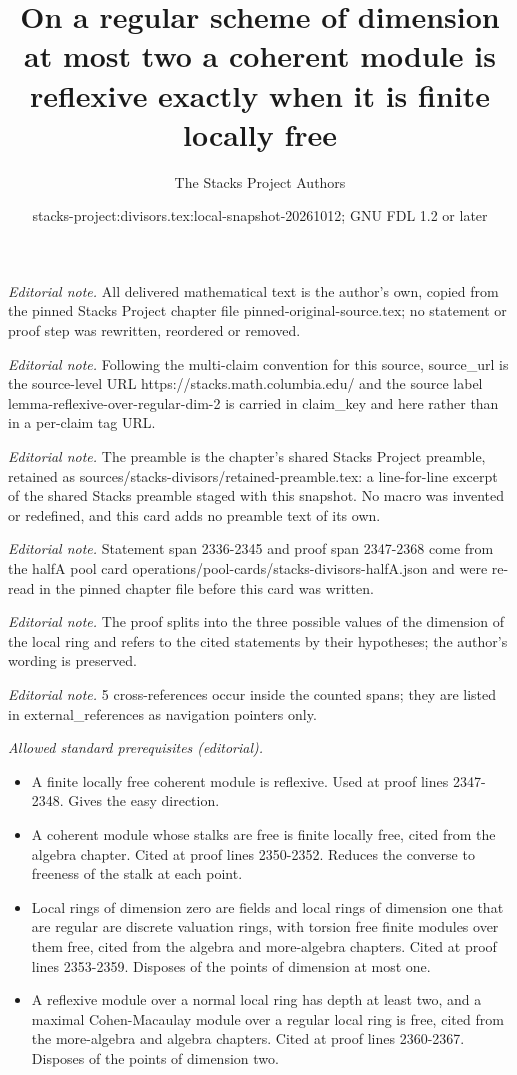 \documentclass[10pt,a4paper]{amsart}
\title{On a regular scheme of dimension at most two a coherent module is reflexive exactly when it is finite locally free}
\author{The Stacks Project Authors}
\date{stacks-project:divisors.tex:local-snapshot-20261012; GNU FDL 1.2 or later}
\theoremstyle{plain}
\theoremstyle{definition}
\theoremstyle{remark}
\numberwithin{equation}{subsection}
\begin{document}
\maketitle
\noindent\textit{Editorial note.} All delivered mathematical text is the author's own, copied from the pinned Stacks Project chapter file pinned-original-source.tex; no statement or proof step was rewritten, reordered or removed.\par\medskip
\noindent\textit{Editorial note.} Following the multi-claim convention for this source, source\_url is the source-level URL https://stacks.math.columbia.edu/ and the source label lemma-reflexive-over-regular-dim-2 is carried in claim\_key and here rather than in a per-claim tag URL.\par\medskip
\noindent\textit{Editorial note.} The preamble is the chapter's shared Stacks Project preamble, retained as sources/stacks-divisors/retained-preamble.tex: a line-for-line excerpt of the shared Stacks preamble staged with this snapshot. No macro was invented or redefined, and this card adds no preamble text of its own.\par\medskip
\noindent\textit{Editorial note.} Statement span 2336-2345 and proof span 2347-2368 come from the halfA pool card operations/pool-cards/stacks-divisors-halfA.json and were re-read in the pinned chapter file before this card was written.\par\medskip
\noindent\textit{Editorial note.} The proof splits into the three possible values of the dimension of the local ring and refers to the cited statements by their hypotheses; the author's wording is preserved.\par\medskip
\noindent\textit{Editorial note.} 5 cross-references occur inside the counted spans; they are listed in external\_references as navigation pointers only.\par\medskip
\noindent\textit{Allowed standard prerequisites (editorial).}\begin{itemize}
\item A finite locally free coherent module is reflexive. Used at proof lines 2347-2348. Gives the easy direction.
\item A coherent module whose stalks are free is finite locally free, cited from the algebra chapter. Cited at proof lines 2350-2352. Reduces the converse to freeness of the stalk at each point.
\item Local rings of dimension zero are fields and local rings of dimension one that are regular are discrete valuation rings, with torsion free finite modules over them free, cited from the algebra and more-algebra chapters. Cited at proof lines 2353-2359. Disposes of the points of dimension at most one.
\item A reflexive module over a normal local ring has depth at least two, and a maximal Cohen-Macaulay module over a regular local ring is free, cited from the more-algebra and algebra chapters. Cited at proof lines 2360-2367. Disposes of the points of dimension two.
\end{itemize}\medskip
\end{document}
